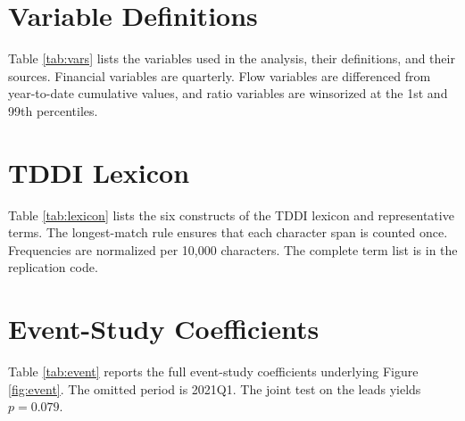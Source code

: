\appendix
\setcounter{table}{0}
\renewcommand{\thetable}{A\arabic{table}}

\section{Variable Definitions}
\label{app:vars}

Table \ref{tab:vars} lists the variables used in the analysis, their definitions, and their sources. Financial variables are quarterly. Flow variables are differenced from year-to-date cumulative values, and ratio variables are winsorized at the 1st and 99th percentiles.



\section{TDDI Lexicon}
\label{app:lexicon}

Table \ref{tab:lexicon} lists the six constructs of the TDDI lexicon and representative terms. The longest-match rule ensures that each character span is counted once. Frequencies are normalized per 10,000 characters. The complete term list is in the replication code.



\section{Event-Study Coefficients}
\label{app:event}

Table \ref{tab:event} reports the full event-study coefficients underlying Figure \ref{fig:event}. The omitted period is 2021Q1. The joint test on the leads yields $p=0.079$.


